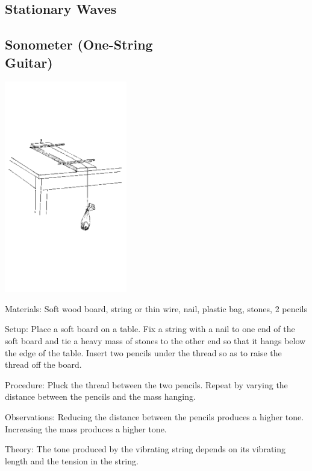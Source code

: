 \begin{multicols}{2}

\section*{Stationary Waves}


\subsection[Sonometer (One-String Guitar)]{Sonometer (One-String \hfill \\ Guitar)}

\begin{center}
\includegraphics[width=0.4\textwidth]{./img/source/sonometer.png}
\end{center}

\begin{description*}
\item[Materials:]{Soft wood board, string or thin wire, nail, plastic bag, stones, 2 pencils}
\item[Setup:]{Place a soft board on a table. Fix a string with a nail to one end of the soft board and tie a heavy mass of stones to the other end so that it hangs below the edge of the table. Insert two pencils under the thread so as to raise the thread off the board.}
\item[Procedure:]{Pluck the thread between the two pencils. Repeat by varying the distance between the pencils and the mass hanging.}
\item[Observations:]{Reducing the distance between the pencils produces a higher tone. Increasing the mass produces a higher tone.}
\item[Theory:]{The tone produced by the vibrating string depends on its vibrating length and the tension in the string.}
\end{description*}


\end{multicols}
